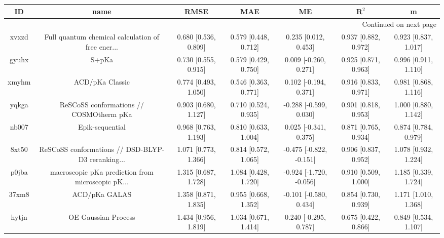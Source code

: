 \documentclass{article}
\begin{document}
\begin{center}
\begin{longtable}{|ccccccc|}
\toprule
    ID &                                               name &                  RMSE &                   MAE &                       ME &                 R$^2$ &                      m \\
\midrule
\endhead
\midrule
\multicolumn{7}{r}{{Continued on next page}} \\
\midrule
\endfoot

\bottomrule
\endlastfoot
 xvxzd &  Full quantum chemical calculation of free ener... &  0.680 [0.536, 0.809] &  0.579 [0.448, 0.712] &     0.235 [0.012, 0.453] &  0.937 [0.882, 0.972] &   0.923 [0.837, 1.017] \\
 gyuhx &                                              S+pKa &  0.730 [0.555, 0.915] &  0.579 [0.429, 0.750] &    0.009 [-0.260, 0.271] &  0.925 [0.871, 0.963] &   0.996 [0.911, 1.110] \\
 xmyhm &                                    ACD/pKa Classic &  0.774 [0.493, 1.050] &  0.546 [0.363, 0.771] &    0.102 [-0.194, 0.371] &  0.916 [0.833, 0.971] &   0.981 [0.868, 1.116] \\
 yqkga &            ReSCoSS conformations // COSMOtherm pKa &  0.903 [0.680, 1.127] &  0.710 [0.524, 0.935] &   -0.288 [-0.599, 0.030] &  0.901 [0.818, 0.953] &   1.000 [0.880, 1.142] \\
 nb007 &                                    Epik-sequential &  0.968 [0.763, 1.193] &  0.810 [0.633, 1.004] &    0.025 [-0.341, 0.375] &  0.871 [0.765, 0.934] &   0.874 [0.784, 0.979] \\
 8xt50 &  ReSCoSS conformations // DSD-BLYP-D3 reranking... &  1.071 [0.773, 1.366] &  0.814 [0.572, 1.065] &  -0.475 [-0.822, -0.151] &  0.906 [0.837, 0.952] &   1.078 [0.932, 1.224] \\
 p0jba &  macroscopic pKa prediction from microscopic pK... &  1.315 [0.687, 1.728] &  1.084 [0.428, 1.720] &  -0.924 [-1.720, -0.056] &  0.910 [0.509, 1.000] &   1.185 [0.339, 1.724] \\
 37xm8 &                                      ACD/pKa GALAS &  1.358 [0.871, 1.835] &  0.955 [0.668, 1.352] &   -0.101 [-0.580, 0.434] &  0.854 [0.730, 0.939] &   1.171 [1.010, 1.368] \\
 hytjn &                                OE Gaussian Process &  1.434 [0.956, 1.819] &  1.034 [0.671, 1.414] &    0.240 [-0.295, 0.787] &  0.675 [0.422, 0.866] &   0.849 [0.534, 1.107] \\

\end{longtable}
\end{center}
\end{document}
